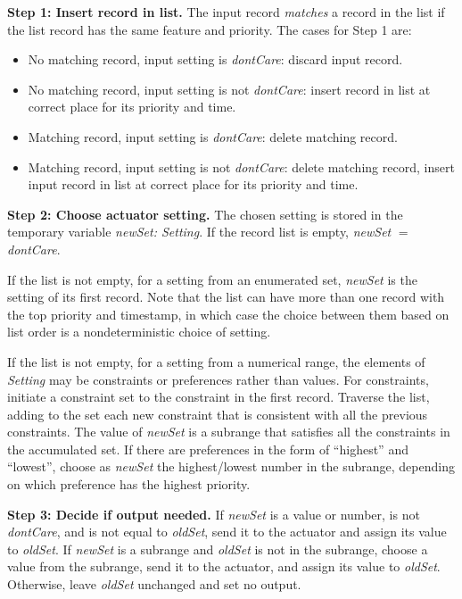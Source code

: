 \documentclass[conference]{IEEEtran}
\begin{document}
\vspace{2mm}
{\bf Step 1: Insert record in list.}
The input record {\it matches} a record in the list if the list record
has the same feature and priority.
The cases for Step 1 are:
\begin{itemize}
\item
No matching record, input setting is {\it dontCare}: discard input record.
\item
No matching record, input setting is not {\it dontCare}: 
insert record in list at correct place for its priority and time.
\item
Matching record, input setting is {\it dontCare}: delete matching record.
\item
Matching record, input setting is not {\it dontCare}: delete matching
record, insert input record in list at correct place for its priority
and time.
\end{itemize}

\vspace{2mm}
{\bf Step 2: Choose actuator setting.}  The chosen setting is stored in
the temporary variable {\it newSet: Setting}. 
If the record list is empty, {\it newSet} $=$ {\it dontCare}.

If the list is not empty,
for a setting from an enumerated set,
{\it newSet} is the setting of its first record.
Note that the list can have more than one record with the top priority
and timestamp, in which case the choice between them based on
list order is a nondeterministic choice of setting.

If the list is not empty, for a setting from a numerical range,
the elements of {\it Setting} may be constraints or preferences
rather than values.
For constraints,
initiate a constraint set to the constraint in the first
record.
Traverse the list, adding to the set each new constraint that is 
consistent with all the previous constraints.  
The value of {\it newSet} is a subrange that satisfies all the
constraints in the accumulated set.
If there are preferences in the form of ``highest'' and ``lowest'', 
choose as {\it newSet} the highest/lowest number in the subrange,
depending on which preference has the highest priority.

\vspace{2mm}
{\bf Step 3: Decide if output needed.}  
If {\it newSet} is a value or number, is not {\it dontCare},
and is not equal to {\it oldSet},
send it to the actuator and assign its value to {\it oldSet}.
If {\it newSet} is a subrange and {\it oldSet} is not in the
subrange, choose a value from the subrange, send it to the actuator,
and assign its value to {\it oldSet}.
Otherwise, leave {\it oldSet} unchanged and set no output.
\end{document}

